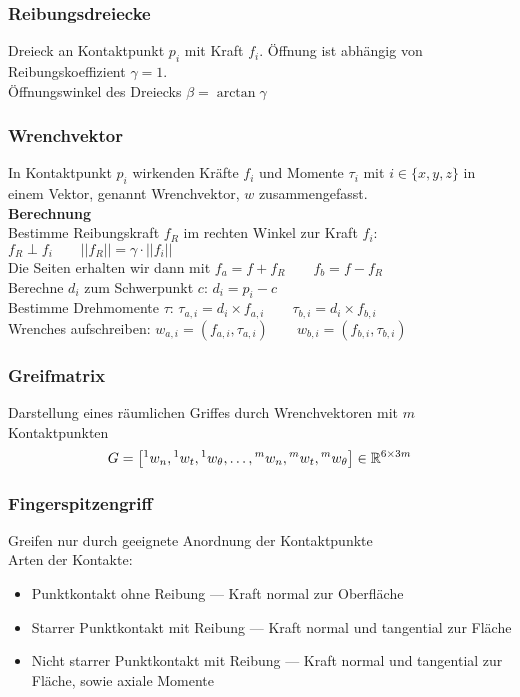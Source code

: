 \subsubsection{Reibungsdreiecke}
Dreieck an Kontaktpunkt \(p_i\) mit Kraft \(f_i\). Öffnung ist abhängig von Reibungskoeffizient \(\gamma = 1\).\\
Öffnungswinkel des Dreiecks \(\beta = \arctan \gamma\)

\subsubsection{Wrenchvektor}
In Kontaktpunkt \(p_i\) wirkenden Kräfte \(f_i\) und Momente \(\tau_i\) mit \(i \in \{x, y, z\}\) in einem Vektor,
genannt Wrenchvektor, \(w\) zusammengefasst.\\

\textbf{Berechnung}\\
Bestimme Reibungskraft \(f_R\) im rechten Winkel zur Kraft \(f_i\): \(f_R \perp f_i \qquad ||f_R|| = \gamma \cdot ||f_i||\)\\
Die Seiten erhalten wir dann mit \(f_a = f + f_R \qquad f_b = f - f_R\)\\
Berechne \(d_i\) zum Schwerpunkt \(c\): \(d_i = p_i - c\)\\
Bestimme Drehmomente \(\tau\): \(\tau_{a,i} = d_i \times f_{a,i} \qquad \tau_{b,i} = d_i \times f_{b,i}\)\\
Wrenches aufschreiben: \(w_{a,i} = (f_{a,i}, \tau_{a,i}) \qquad w_{b,i} = (f_{b,i}, \tau_{b, i})\)

\subsubsection{Greifmatrix}
Darstellung eines räumlichen Griffes durch Wrenchvektoren mit \(m\) Kontaktpunkten
\[G = \left[ {}^1w_n, {}^1w_t, {}^1w_{\theta}, \ldots, {}^mw_n, {}^mw_t, {}^mw_{\theta}\right] \in \mathbb{R}^{6\times3m}\]

\subsubsection{Fingerspitzengriff}
Greifen nur durch geeignete Anordnung der Kontaktpunkte\\
Arten der Kontakte:
\begin{itemize}
\item Punktkontakt ohne Reibung --- Kraft normal zur Oberfläche
\item Starrer Punktkontakt mit Reibung --- Kraft normal und tangential zur Fläche
\item Nicht starrer Punktkontakt mit Reibung --- Kraft normal und tangential zur Fläche, sowie axiale Momente
\end{itemize}

